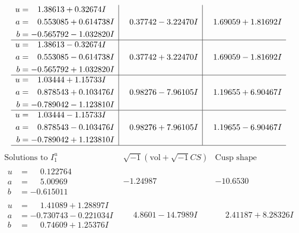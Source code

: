 \documentclass[1p]{elsarticle_modified}
\theoremstyle{definition}
\newcommand{\I}{\sqrt{-1}}
\begin{document}
$$\begin{array}{c|c|c}
\begin{aligned}
u &= \phantom{-}1.38613 + 0.32674 I \\
a &= \phantom{-}0.553085 + 0.614738 I \\
b &= -0.565792 - 1.032820 I\end{aligned}
 & \phantom{-}0.37742 - 3.22470 I & \phantom{-}1.69059 + 1.81692 I \\ \hline\begin{aligned}
u &= \phantom{-}1.38613 - 0.32674 I \\
a &= \phantom{-}0.553085 - 0.614738 I \\
b &= -0.565792 + 1.032820 I\end{aligned}
 & \phantom{-}0.37742 + 3.22470 I & \phantom{-}1.69059 - 1.81692 I \\ \hline\begin{aligned}
u &= \phantom{-}1.03444 + 1.15733 I \\
a &= \phantom{-}0.878543 + 0.103476 I \\
b &= -0.789042 - 1.123810 I\end{aligned}
 & \phantom{-}0.98276 - 7.96105 I & \phantom{-}1.19655 + 6.90467 I \\ \hline\begin{aligned}
u &= \phantom{-}1.03444 - 1.15733 I \\
a &= \phantom{-}0.878543 - 0.103476 I \\
b &= -0.789042 + 1.123810 I\end{aligned}
 & \phantom{-}0.98276 + 7.96105 I & \phantom{-}1.19655 - 6.90467 I\\
 \hline 
 \end{array}$$\newpage$$\begin{array}{c|c|c}  
\text{Solutions to }I^u_{1}& \I (\text{vol} + \sqrt{-1}CS) & \text{Cusp shape}\\
 \hline 
\begin{aligned}
u &= \phantom{-}0.122764\phantom{ +0.000000I} \\
a &= \phantom{-}5.00969\phantom{ +0.000000I} \\
b &= -0.615011\phantom{ +0.000000I}\end{aligned}
 & -1.24987\phantom{ +0.000000I} & -10.6530\phantom{ +0.000000I} \\ \hline\begin{aligned}
u &= \phantom{-}1.41089 + 1.28897 I \\
a &= -0.730743 - 0.221034 I \\
b &= \phantom{-}0.74609 + 1.25376 I\end{aligned}
 & \phantom{-}4.8601 - 14.7989 I & \phantom{-}2.41187 + 8.28326 I \\ \hline\begin{aligned}

\end{aligned}
\end{array}$$
\end{document}
